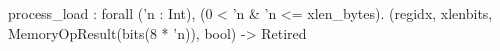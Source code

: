 process_load : forall ('n : Int), (0 < 'n & 'n <= xlen_bytes).
  (regidx, xlenbits, MemoryOpResult(bits(8 * 'n)), bool) -> Retired